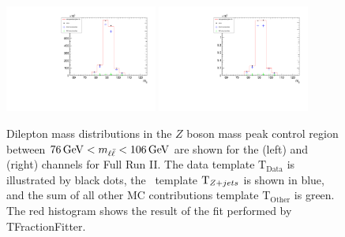 \begin{figure}[htb]
  \begin{center}
        \includegraphics[width=0.445\textwidth]{fig_fullRun2UL/fit_status_ee.pdf}
        \includegraphics[width=0.445\textwidth]{fig_fullRun2UL/fit_status_mumu.pdf}
        \caption{
            \small Dilepton mass distributions in the $Z$ boson mass peak control region between $\SI{76}{\GeV} < \mll < \SI{106}{\GeV}$ are shown for the \ee (left) and \mumu (right) channels for Full Run II. 
            The data template $\text{T}_\text{Data}$ is illustrated by black dots, the \zjets\ template $\text{T}_{Z+jets}$ is shown in blue, and the sum of all other MC contributions template $\text{T}_\text{Other}$ is green. 
            The red histogram shows the result of the fit performed by TFractionFitter.
            \label{fig:fitstatusfullRun2UL}
    }
  \end{center}
\end{figure}


